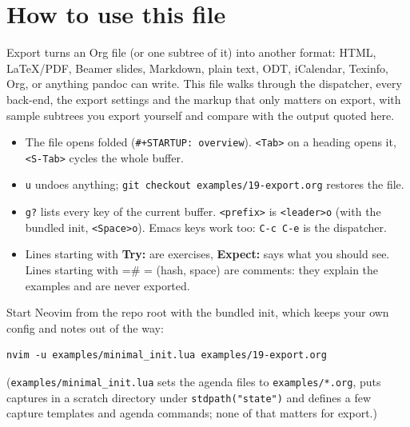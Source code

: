 \section{How to use this file}
\label{sec:org15303e2}
Export turns an Org file (or one subtree of it) into another format: HTML,
\LaTeX{}/PDF, Beamer slides, Markdown, plain text, ODT, iCalendar, Texinfo,
Org, or anything pandoc can write. This file walks through the dispatcher,
every back-end, the export settings and the markup that only matters on
export, with sample subtrees you export yourself and compare with the
output quoted here.

\begin{itemize}
\item The file opens folded (\texttt{\#+STARTUP: overview}). \texttt{<Tab>} on a heading opens
it, \texttt{<S-Tab>} cycles the whole buffer.
\item \texttt{u} undoes anything; \texttt{git checkout examples/19-export.org} restores the
file.
\item \texttt{g?} lists every key of the current buffer. \texttt{<prefix>} is \texttt{<leader>o}
(with the bundled init, \texttt{<Space>o}). Emacs keys work too: \texttt{C-c C-e} is the
dispatcher.
\item Lines starting with \textbf{Try:} are exercises, \textbf{Expect:} says what you should
see. Lines starting with =\# = (hash, space) are comments: they explain
the examples and are never exported.
\end{itemize}

Start Neovim from the repo root with the bundled init, which keeps your own
config and notes out of the way:

\begin{verbatim}
nvim -u examples/minimal_init.lua examples/19-export.org
\end{verbatim}

(\texttt{examples/minimal\_init.lua} sets the agenda files to \texttt{examples/*.org}, puts
captures in a scratch directory under \texttt{stdpath("state")} and defines a few
capture templates and agenda commands; none of that matters for export.)
